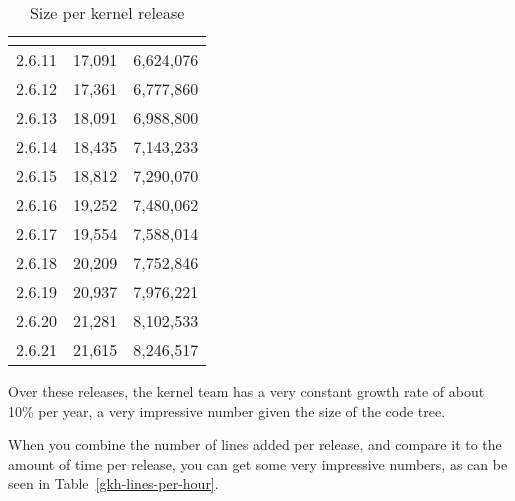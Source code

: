 \documentclass[final]{ols}
\begin{document}
\begin{table}[tbph]
\begin{center}
\setlength{\tabcolsep}{2.0ex}
\begin{tabular}{|r|r|r|}
\hline
\multicolumn{1}{|p{1.3cm}|}{\centering{Kernel Version}} & 
\multicolumn{1}{|c|}{\raisebox{-1.5ex}{Files}} & 
\multicolumn{1}{|c|}{\raisebox{-1.5ex}{Lines}} \\
\hline
\hline
\rule[-0.1ex]{0pt}{2.5ex}2.6.11	& 17,091	& 6,624,076	\\
2.6.12	& 17,361	& 6,777,860	\\
2.6.13	& 18,091	& 6,988,800	\\
2.6.14	& 18,435	& 7,143,233	\\
2.6.15	& 18,812	& 7,290,070	\\
2.6.16	& 19,252	& 7,480,062	\\
2.6.17	& 19,554	& 7,588,014	\\
2.6.18	& 20,209	& 7,752,846	\\
2.6.19	& 20,937	& 7,976,221	\\
2.6.20	& 21,281	& 8,102,533	\\
2.6.21	& 21,615	& 8,246,517	\\
\hline
\end{tabular}
\caption{Size per kernel release}
\label{gkh-lines}
\end{center}
\end{table}

Over these releases, the kernel team has a very constant growth rate of
about 10\% per year, a very impressive number given the size of the code
tree.

When you combine the number of lines added per release, and compare it
to the amount of time per release, you can get some very impressive
numbers, as can be seen in Table~\ref{gkh-lines-per-hour}.
\end{document}
